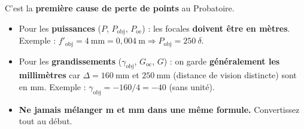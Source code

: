 \documentclass[11pt]{article}
\begin{document}
\begin{attention}
C'est la \textbf{première cause de perte de points} au Probatoire.
\begin{itemize}
    \item Pour les \textbf{puissances} ($P$, $P_{\text{obj}}$, $P_{\text{oc}}$) : les focales \textbf{doivent être en mètres}. Exemple : $f'_{\text{obj}} = 4\ \text{mm} = 0,004\ \text{m} \Rightarrow P_{\text{obj}} = 250\ \delta$.
    \item Pour les \textbf{grandissements} ($\gamma_{\text{obj}}$, $G_{\text{oc}}$, $G$) : on garde \textbf{généralement les millimètres} car $\Delta = 160\ \text{mm}$ et $250\ \text{mm}$ (distance de vision distincte) sont en mm. Exemple : $\gamma_{\text{obj}} = -160/4 = -40$ (sans unité).
    \item \textbf{Ne jamais mélanger m et mm dans une même formule.} Convertissez tout au début.
\end{itemize}
\end{attention}
\end{document}
